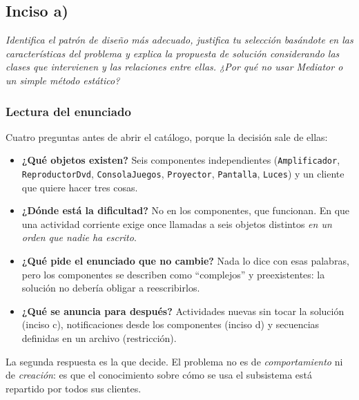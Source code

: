 {}
\subsection*{Inciso a)}

\sloppy

\textit{Identifica el patrón de diseño más adecuado, justifica tu selección basándote en las
características del problema y explica la propuesta de solución considerando las clases que
intervienen y las relaciones entre ellas. ¿Por qué no usar Mediator o un simple método
estático?}

\vspace{0.4cm}

\subsubsection*{Lectura del enunciado}

Cuatro preguntas antes de abrir el catálogo, porque la decisión sale de ellas:

\begin{itemize}[leftmargin=1.2cm]
    \item \textbf{¿Qué objetos existen?} Seis componentes independientes
          (\texttt{Amplificador}, \texttt{ReproductorDvd}, \texttt{ConsolaJuegos},
          \texttt{Proyector}, \texttt{Pantalla}, \texttt{Luces}) y un cliente que quiere
          hacer tres cosas.
    \item \textbf{¿Dónde está la dificultad?} No en los componentes, que funcionan. En que
          una actividad corriente exige once llamadas a seis objetos distintos
          \emph{en un orden que nadie ha escrito}.
    \item \textbf{¿Qué pide el enunciado que no cambie?} Nada lo dice con esas palabras,
          pero los componentes se describen como ``complejos'' y preexistentes: la solución
          no debería obligar a reescribirlos.
    \item \textbf{¿Qué se anuncia para después?} Actividades nuevas sin tocar la solución
          (inciso c), notificaciones desde los componentes (inciso d) y secuencias definidas
          en un archivo (restricción).
\end{itemize}

La segunda respuesta es la que decide. El problema no es de \emph{comportamiento} ni de
\emph{creación}: es que el conocimiento sobre cómo se usa el subsistema está repartido por
todos sus clientes.

